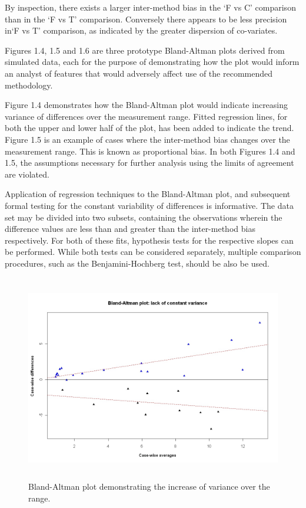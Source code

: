 \documentclass[Main.tex]{subfiles}
\begin{document}
	By inspection, there exists a larger inter-method bias in the `F
	vs C' comparison than in the `F vs T' comparison. Conversely there
	appears to be less precision in`F vs T' comparison, as indicated
	by the greater dispersion of co-variates.
	
	Figures 1.4, 1.5 and 1.6 are three prototype Bland-Altman plots
	derived from simulated data, each for the purpose of demonstrating
	how the plot would inform an analyst of features that would
	adversely affect use of the recommended methodology.
	
	Figure 1.4 demonstrates how the Bland-Altman plot would indicate
	increasing variance of differences over the measurement range.
	Fitted regression lines, for both the upper and lower half of the
	plot, has been added to indicate the trend. Figure 1.5 is an
	example of cases where the inter-method bias changes over the
	measurement range. This is known as proportional bias. In both
	Figures 1.4 and 1.5, the assumptions necessary for further
	analysis using the limits of agreement are violated.
	
	Application of regression techniques to the Bland-Altman plot, and
	subsequent formal testing for the constant variability of
	differences is informative. The data set may be divided into two
	subsets, containing the observations wherein the difference values
	are less than and greater than the inter-method bias respectively.
	For both of these fits, hypothesis tests for the respective slopes
	can be performed. While both tests can be considered separately,
	multiple comparison procedures, such as the Benjamini-Hochberg
	\citep{BH} test, should be also be used.
	
	\begin{figure}[h!]
		\begin{center}
			\includegraphics[height=90mm]{images/BAFanEffect.jpeg}
			\caption{Bland-Altman plot demonstrating the increase of variance over the range.}\label{BAFanEffect}
		\end{center}
	\end{figure}
	
\end{document}
